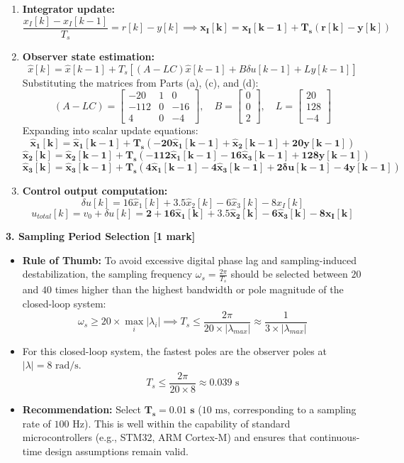 \documentclass[12pt,onecolumn,twoside ]{article}
\begin{document}
	\begin{enumerate}
		\item
		\textbf{Integrator update:} \[
		\frac{x_I[k] - x_I[k-1]}{T_s} = r[k] - y[k] \implies \mathbf{x_I[k] = x_I[k-1] + T_s \left( r[k] - y[k] \right)}
		\]
		\item
		\textbf{Observer state estimation:} \[
		\hat{x}[k] = \hat{x}[k-1] + T_s \left[ (A - LC) \hat{x}[k-1] + B \delta u[k-1] + L y[k-1] \right]
		\] Substituting the matrices from Parts (a), (c), and (d): \[
		(A - LC) = \begin{bmatrix} -20 & 1 & 0 \\ -112 & 0 & -16 \\ 4 & 0 & -4 \end{bmatrix}, \quad B = \begin{bmatrix} 0 \\ 0 \\ 2 \end{bmatrix}, \quad L = \begin{bmatrix} 20 \\ 128 \\ -4 \end{bmatrix}
		\] Expanding into scalar update equations: \[
		\mathbf{\hat{x}_1[k] = \hat{x}_1[k-1] + T_s \left( -20 \hat{x}_1[k-1] + \hat{x}_2[k-1] + 20 y[k-1] \right)}
		\] \[
		\mathbf{\hat{x}_2[k] = \hat{x}_2[k-1] + T_s \left( -112 \hat{x}_1[k-1] - 16 \hat{x}_3[k-1] + 128 y[k-1] \right)}
		\] \[
		\mathbf{\hat{x}_3[k] = \hat{x}_3[k-1] + T_s \left( 4 \hat{x}_1[k-1] - 4 \hat{x}_3[k-1] + 2 \delta u[k-1] - 4 y[k-1] \right)}
		\]
		\item
		\textbf{Control output computation:} \[
		\delta u[k] = 16 \hat{x}_1[k] + 3.5 \hat{x}_2[k] - 6 \hat{x}_3[k] - 8 x_I[k]
		\] \[
		u_{total}[k] = v_0 + \delta u[k] = \mathbf{2 + 16 \hat{x}_1[k] + 3.5 \hat{x}_2[k] - 6 \hat{x}_3[k] - 8 x_I[k]}
		\]
	\end{enumerate}
	\textbf{3. Sampling Period Selection [1 mark]}
	\begin{itemize}
		\item
		\textbf{Rule of Thumb:} To avoid excessive digital phase lag and sampling-induced destabilization, the sampling frequency $\omega_s = \frac{2\pi}{T_s}$ should be selected between $20$ and $40$ times higher than the highest bandwidth or pole magnitude of the closed-loop system: \[
		\omega_s \ge 20 \times \max_i |\lambda_i| \implies T_s \le \frac{2\pi}{20 \times |\lambda_{max}|} \approx \frac{1}{3 \times |\lambda_{max}|}
		\]
		\item
		For this closed-loop system, the fastest poles are the observer poles at $|\lambda| = 8\text{ rad/s}$. \[
		T_s \le \frac{2\pi}{20 \times 8} \approx 0.039\text{ s}
		\]
		\item
		\textbf{Recommendation:} Select $\mathbf{T_s = 0.01\text{ s}}$ ($10\text{ ms}$, corresponding to a sampling rate of $100\text{ Hz}$). This is well within the capability of standard microcontrollers (e.g., STM32, ARM Cortex-M) and ensures that continuous-time design assumptions remain valid.
	\end{itemize}
	
\end{document}
